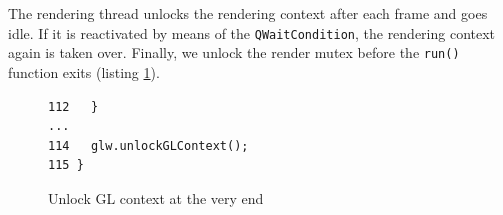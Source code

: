 \documentclass[jou,noapacite]{apa}
\begin{document}
%
The rendering thread unlocks the rendering context after each frame and goes
idle.
%
If it is reactivated by means of the \lstinline|QWaitCondition|, the rendering
context again is taken over.
%
Finally, we unlock the render mutex before the \lstinline|run()| function exits
(listing \ref{lst:done}).
\begin{figure}[h]
\begin{lstlisting}[basicstyle=\scriptsize]
112   }
...
114   glw.unlockGLContext();
115 }
\end{lstlisting}
\caption{Unlock GL context at the very end}
\label{lst:done}
\end{figure}
\end{document}
